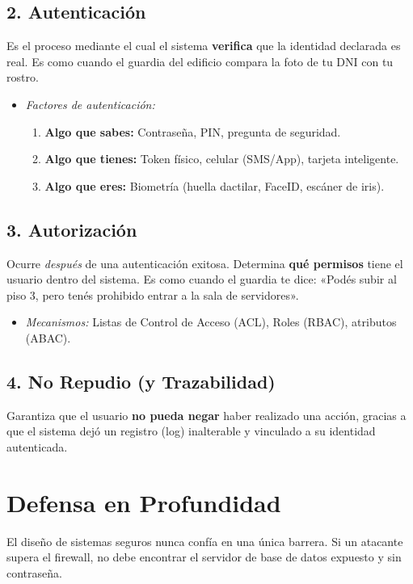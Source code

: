 \documentclass[11pt,a4paper]{article}
\begin{document}
\subsection{2. Autenticación}
Es el proceso mediante el cual el sistema \textbf{verifica} que la identidad declarada es real. Es como cuando el guardia del edificio compara la foto de tu DNI con tu rostro.
\begin{itemize}[leftmargin=*]
  \item \textit{Factores de autenticación:}
  \begin{enumerate}
    \item \textbf{Algo que sabes:} Contraseña, PIN, pregunta de seguridad.
    \item \textbf{Algo que tienes:} Token físico, celular (SMS/App), tarjeta inteligente.
    \item \textbf{Algo que eres:} Biometría (huella dactilar, FaceID, escáner de iris).
  \end{enumerate}
\end{itemize}

\subsection{3. Autorización}
Ocurre \textit{después} de una autenticación exitosa. Determina \textbf{qué permisos} tiene el usuario dentro del sistema. Es como cuando el guardia te dice: «Podés subir al piso 3, pero tenés prohibido entrar a la sala de servidores».
\begin{itemize}[leftmargin=*]
  \item \textit{Mecanismos:} Listas de Control de Acceso (ACL), Roles (RBAC), atributos (ABAC).
\end{itemize}

\subsection{4. No Repudio (y Trazabilidad)}
Garantiza que el usuario \textbf{no pueda negar} haber realizado una acción, gracias a que el sistema dejó un registro (log) inalterable y vinculado a su identidad autenticada.

\section{Defensa en Profundidad}
El diseño de sistemas seguros nunca confía en una única barrera. Si un atacante supera el firewall, no debe encontrar el servidor de base de datos expuesto y sin contraseña.
\end{document}
